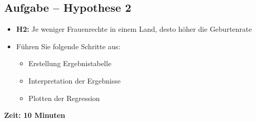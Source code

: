 \documentclass[aspectratio=169, journal, x11names, unknownkeysallowed, hyperref={colorlinks,
linkcolor = SS2,
urlcolor  = F3,
citecolor = F3,
anchorcolor = A4}, 12pt]{beamer}
\begin{document}
\subsection{Aufgabe -- Hypothese 2}
  \begin{frame}[t, fragile]
    \begin{minipage}[t]{0.45\textwidth}
        \begin{itemize}
          \item[] \textbf{H2:} Je weniger Frauenrechte in einem Land, desto höher die Geburtenrate
          \item Führen Sie folgende Schritte aus:
          \begin{itemize}
            \item Erstellung Ergebnistabelle
            \item Interpretation der Ergebnisse
            \item Plotten der Regression
          \end{itemize}
        \end{itemize}
      \end{minipage}
      \begin{minipage}[t]{0.45\textwidth}
        \centering
        \textbf{Zeit: 10 Minuten}
      \end{minipage}
  \end{frame}
\end{document}
